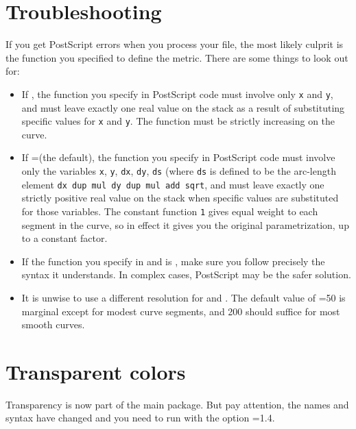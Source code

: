 \documentclass[11pt,english,BCOR=10mm,DIV=12,bibliography=totoc,parskip=false,headings=small,
    headinclude=false,footinclude=false,oneside]{pst-doc}
\begin{document}
\section{Troubleshooting}
If you get PostScript errors when you process your file, the  most likely culprit is the 
function you specified to define the metric. There are some  things to look out for:
\begin{itemize}
\item If , the function you specify in PostScript code must 
involve only \texttt{x} and \texttt{y}, and must leave exactly one real value on the stack as a result of 
substituting specific values for \texttt{x} and \texttt{y}. The function must be strictly increasing on the curve.
\item If =\false (the default), the function you specify in PostScript 
code must involve only the variables \texttt{x}, \texttt{y}, \texttt{dx}, \texttt{dy}, \texttt{ds} (where \texttt{ds} 
is defined to be the arc-length element \texttt{dx dup mul dy dup mul add sqrt}, and must leave exactly 
one strictly positive real value on the stack when specific values are substituted for those variables. 
The constant function \texttt{1} gives equal weight to each segment in the curve, so in effect it gives 
you the original parametrization, up to a constant factor.
\item If the function you specify in  and  is , 
make sure you follow precisely the syntax it understands. In complex cases, PostScript may be the safer solution.
\item It is unwise to use a different resolution for  and . 
The default value of =50 is marginal except for modest curve segments, and 200 should 
suffice for most smooth curves.
\end{itemize}


\section{Transparent colors}

Transparency is now part of the main  package.
But pay attention, the names and syntax have changed and you need
to run  with the option
=1.4.
\end{document}
